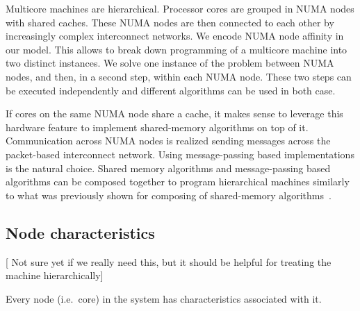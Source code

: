 \documentclass{article}
\newcommand{\stefan}[1]{
  {\color{skRed}[{\color{red}{SK}} #1]}}
\begin{document}
Multicore machines are hierarchical. Processor cores are grouped in
NUMA nodes with shared caches. These NUMA nodes are then connected to
each other by increasingly complex interconnect networks. 
We encode NUMA node affinity in our model. This allows to break down
programming of a multicore machine into two distinct instances. We
solve one instance of the problem between NUMA nodes, and then, in a
second step, within each NUMA node. These two steps can be executed
independently and different algorithms can be used in both case.

If cores on the same NUMA node share a cache, it makes sense to
leverage this hardware feature to implement shared-memory algorithms
on top of it. %
Communication across NUMA nodes is realized sending messages across
the packet-based interconnect network. Using message-passing based
implementations is the natural choice. %
Shared memory algorithms and message-passing based algorithms can be
composed together to program hierarchical machines similarly to what
was previously shown for composing of shared-memory
algorithms~\cite{Alistarh2012}.

\subsection{Node characteristics} 
\label{sec:model_nodes}

\stefan{Not sure yet if we really need this, but it should be helpful
  for treating the machine hierarchically}

Every node (i.e.\ core) in the system has characteristics associated
with it.
\end{document}

